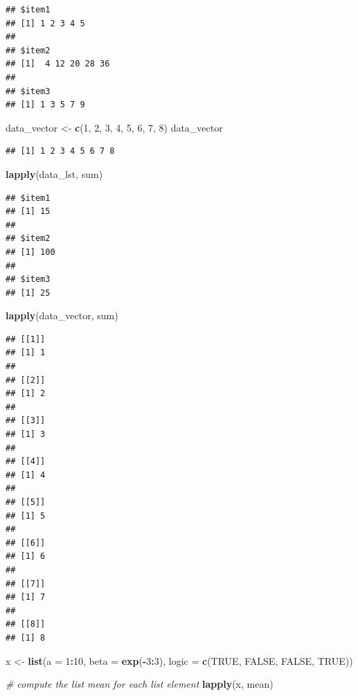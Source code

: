 \documentclass[
]{book}
\newenvironment{Shaded}{\begin{snugshade}}{\end{snugshade}}
\newcommand{\CommentTok}[1]{\textcolor[rgb]{0.56,0.35,0.01}{\textit{#1}}}
\newcommand{\DataTypeTok}[1]{\textcolor[rgb]{0.13,0.29,0.53}{#1}}
\newcommand{\DecValTok}[1]{\textcolor[rgb]{0.00,0.00,0.81}{#1}}
\newcommand{\KeywordTok}[1]{\textcolor[rgb]{0.13,0.29,0.53}{\textbf{#1}}}
\newcommand{\NormalTok}[1]{#1}
\newcommand{\OperatorTok}[1]{\textcolor[rgb]{0.81,0.36,0.00}{\textbf{#1}}}
\newcommand{\OtherTok}[1]{\textcolor[rgb]{0.56,0.35,0.01}{#1}}
\newcommand{\StringTok}[1]{\textcolor[rgb]{0.31,0.60,0.02}{#1}}
\begin{document}
\begin{verbatim}
## $item1
## [1] 1 2 3 4 5
## 
## $item2
## [1]  4 12 20 28 36
## 
## $item3
## [1] 1 3 5 7 9
\end{verbatim}

\begin{Shaded}
\begin{Highlighting}[]
\NormalTok{data_vector <-}\StringTok{ }\KeywordTok{c}\NormalTok{(}\DecValTok{1}\NormalTok{, }\DecValTok{2}\NormalTok{, }\DecValTok{3}\NormalTok{, }\DecValTok{4}\NormalTok{, }\DecValTok{5}\NormalTok{, }\DecValTok{6}\NormalTok{, }\DecValTok{7}\NormalTok{, }\DecValTok{8}\NormalTok{)}
\NormalTok{data_vector}
\end{Highlighting}
\end{Shaded}

\begin{verbatim}
## [1] 1 2 3 4 5 6 7 8
\end{verbatim}

\begin{Shaded}
\begin{Highlighting}[]
\KeywordTok{lapply}\NormalTok{(data_lst, sum)}
\end{Highlighting}
\end{Shaded}

\begin{verbatim}
## $item1
## [1] 15
## 
## $item2
## [1] 100
## 
## $item3
## [1] 25
\end{verbatim}

\begin{Shaded}
\begin{Highlighting}[]
\KeywordTok{lapply}\NormalTok{(data_vector, sum)}
\end{Highlighting}
\end{Shaded}

\begin{verbatim}
## [[1]]
## [1] 1
## 
## [[2]]
## [1] 2
## 
## [[3]]
## [1] 3
## 
## [[4]]
## [1] 4
## 
## [[5]]
## [1] 5
## 
## [[6]]
## [1] 6
## 
## [[7]]
## [1] 7
## 
## [[8]]
## [1] 8
\end{verbatim}

\begin{Shaded}
\begin{Highlighting}[]
\NormalTok{x <-}\StringTok{ }\KeywordTok{list}\NormalTok{(}\DataTypeTok{a =} \DecValTok{1}\OperatorTok{:}\DecValTok{10}\NormalTok{, }\DataTypeTok{beta =} \KeywordTok{exp}\NormalTok{(}\OperatorTok{-}\DecValTok{3}\OperatorTok{:}\DecValTok{3}\NormalTok{), }\DataTypeTok{logic =} \KeywordTok{c}\NormalTok{(}\OtherTok{TRUE}\NormalTok{, }\OtherTok{FALSE}\NormalTok{,}
    \OtherTok{FALSE}\NormalTok{, }\OtherTok{TRUE}\NormalTok{))}

\CommentTok{# compute the list mean for each list element}
\KeywordTok{lapply}\NormalTok{(x, mean)}
\end{Highlighting}
\end{Shaded}
\end{document}
